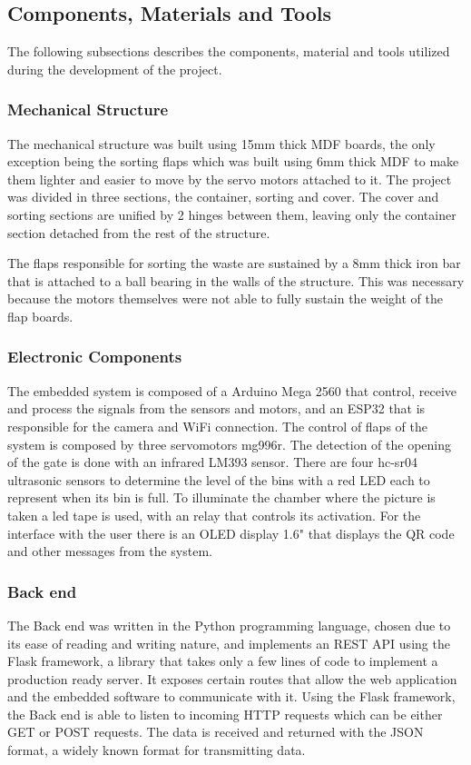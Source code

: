 \documentclass[a4paper,11pt]{article}
\begin{document}
\subsection{Components, Materials and Tools}
The following subsections describes the components, material and tools utilized during the development of the project.

\subsubsection{Mechanical Structure}
The mechanical structure was built using 15mm thick MDF boards, the only exception being the sorting flaps which was built using 6mm thick MDF to make them lighter and easier to move by the servo motors attached to it. The project was divided in three sections, the container, sorting and cover. The cover and sorting sections are unified by 2 hinges between them, leaving only the container section detached from the rest of the structure.

The flaps responsible for sorting the waste are sustained by a 8mm thick iron bar that is attached to a ball bearing in the walls of the structure. This was necessary because the motors themselves were not able to fully sustain the weight of the flap boards.

\subsubsection{Electronic Components}
The embedded system is composed of a Arduino Mega 2560 that control, receive and process the signals from the sensors and motors, and an ESP32 that is responsible for the camera and WiFi connection.
The control of flaps of the system is composed by three servomotors mg996r. The detection of the opening of the gate is done with an infrared LM393 sensor. There are four hc-sr04 ultrasonic sensors to determine the level of the bins with a red LED each to represent when its bin is full. To illuminate the chamber where the picture is taken a led tape is used, with an relay that controls its activation. For the interface with the user there is an OLED display 1.6" that displays the QR code and other messages from the system.

\subsubsection{Back end}
The Back end was written in the Python programming language, chosen due to its ease of reading and writing nature, and implements an REST API using the Flask framework, a library that takes only a few lines of code to implement a production ready server. It exposes certain routes that allow the web application and the embedded software to communicate with it. Using the Flask framework, the Back end is able to listen to incoming HTTP requests which can be either GET or POST requests. The data is received and returned with the JSON format, a widely known format for transmitting data.
\end{document}
